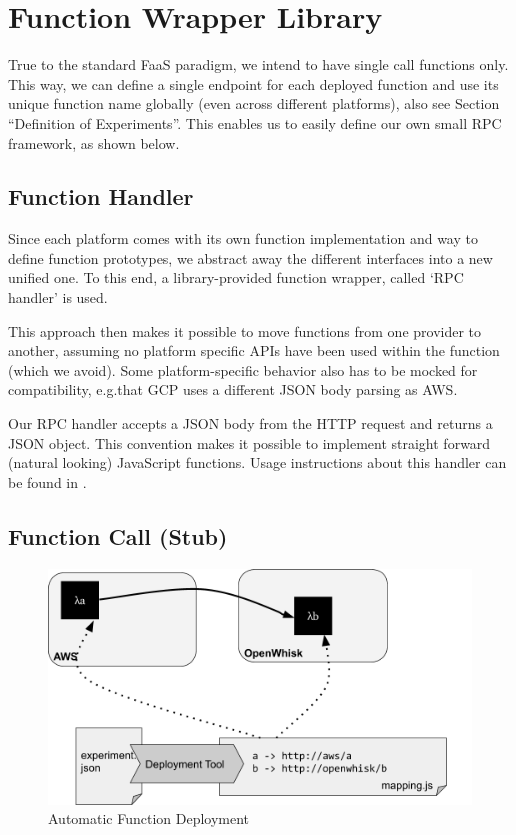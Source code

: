 \documentclass[../main.tex]{subfiles}
\begin{document}


\section{Function Wrapper Library}%
\label{sec:designFunctionWrapper}

True to the standard FaaS paradigm, we intend to have single call functions only. 
This way, we can define a single endpoint for each deployed function and use its unique function name globally 
(even across different platforms), also see Section ``Definition of Experiments''. 
This enables us to easily define our own small RPC framework, as shown below.

\subsection{Function Handler}%
\label{sub:designFunctionHandler}

Since each platform comes with its own function implementation and way to define function prototypes, 
we abstract away the different interfaces into a new unified one. 
To this end, a library-provided function wrapper, called `RPC handler' is used.

This approach then makes it possible to move functions from one provider to another, 
assuming no platform specific APIs have been used within the function (which we avoid). 
Some platform-specific behavior also has to be mocked for compatibility, 
e.g.\@ that GCP uses a different JSON body parsing as AWS.\@

Our RPC handler accepts a JSON body from the HTTP request and returns a JSON object. 
This convention makes it possible to implement straight forward (natural looking) JavaScript functions. 
Usage instructions about this handler can be found in .

\subsection{Function Call (Stub)}%
\label{sub:designFunctionCalls}

\begin{figure}
\begin{center}
  \includegraphics[width=\linewidth,keepaspectratio]{./deployment-tool.png}
\end{center}
\caption{Automatic Function Deployment}%
\label{fig:functionDeployment}
\end{figure}
\end{document}
